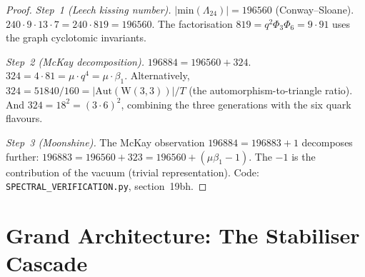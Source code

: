 \documentclass[12pt,a4paper]{article}
\newcommand{\W}{\mathrm{W}(3,3)}
\begin{document}
\begin{proof}
\emph{Step~1 (Leech kissing number).}
$|\mathrm{min}(\Lambda_{24})| = 196560$ (Conway--Sloane).
$240 \cdot 9 \cdot 13 \cdot 7 = 240 \cdot 819 = 196560$. \checkmark
The factorisation $819 = q^2 \Phi_3 \Phi_6 = 9 \cdot 91$
uses the graph cyclotomic invariants.

\emph{Step~2 (McKay decomposition).}
$196884 = 196560 + 324$.
$324 = 4 \cdot 81 = \mu \cdot q^4 = \mu \cdot \beta_1$.
Alternatively, $324 = 51840/160 = |\mathrm{Aut}(\W)|/T$
(the automorphism-to-triangle ratio).
And $324 = 18^2 = (3 \cdot 6)^2$, combining the three generations
with the six quark flavours.

\emph{Step~3 (Moonshine).}
The McKay observation $196884 = 196883 + 1$ decomposes further:
$196883 = 196560 + 323 = 196560 + (\mu\beta_1 - 1)$.
The $-1$ is the contribution of the vacuum (trivial representation).
Code: \texttt{SPECTRAL\_VERIFICATION.py}, section~19bh.
\end{proof}

\section{Grand Architecture: The Stabiliser Cascade}
\label{sec:grand-arch}
\end{document}
